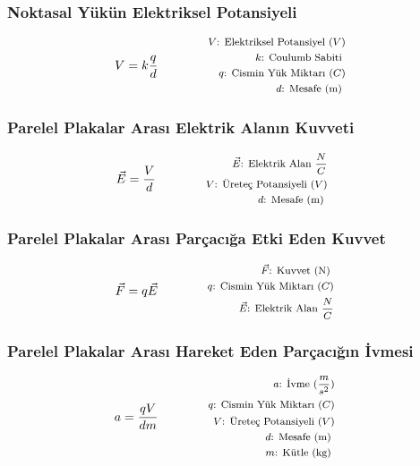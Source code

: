 \subsubsection*{Noktasal Yükün Elektriksel Potansiyeli}
\begin{equation}
    V = k \frac{q}{d} \qquad \qquad \parbox{4cm}{\footnotesize$\begin{aligned}
        V\text{: Elektriksel Potansiyel } (V) \\
        k\text{: Coulumb Sabiti } \\
        q\text{: Cismin Yük Miktarı } (C) \\
        d\text{: Mesafe (m) }
\end{aligned}$}
\end{equation}

\subsubsection*{Parelel Plakalar Arası Elektrik Alanın Kuvveti}
\begin{equation}
    \vec{E} = \frac{V}{d} \qquad \qquad \parbox{4cm}{\footnotesize$\begin{aligned}
        \vec{E}\text{: Elektrik Alan } \frac{N}{C} \\
        V\text{: Üreteç Potansiyeli } (V) \\
        d\text{: Mesafe (m) }
\end{aligned}$}
\end{equation}

\subsubsection*{Parelel Plakalar Arası Parçacığa Etki Eden Kuvvet}
\begin{equation}
    \vec{F} = q\vec{E} \qquad \qquad \parbox{4cm}{\footnotesize$\begin{aligned}
        \vec{F}\text{: Kuvvet (N) } \\
        q\text{: Cismin Yük Miktarı } (C) \\
        \vec{E}\text{: Elektrik Alan } \frac{N}{C}
\end{aligned}$}
\end{equation}

\subsubsection*{Parelel Plakalar Arası Hareket Eden Parçacığın İvmesi}
\begin{equation}
    a = \frac{qV}{dm} \qquad \qquad \parbox{4cm}{\footnotesize$\begin{aligned}
        a\text{: İvme } (\frac{m}{s^2}) \\
        q\text{: Cismin Yük Miktarı } (C) \\
        V\text{: Üreteç Potansiyeli } (V) \\
        d\text{: Mesafe (m) } \\
        m\text{: Kütle (kg) }
\end{aligned}$}
\end{equation}

